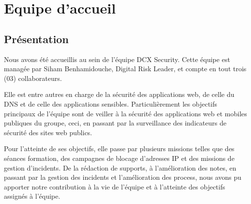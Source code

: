 \documentclass[a4paper,12pt]{book}
\theoremstyle{break}
\begin{document}
\section{Equipe d’accueil}
\subsection{Présentation}
Nous avons été accueillis au sein de l’équipe DCX Security. Cette équipe est managée par Siham Benhamidouche, Digital Risk Leader, et compte en tout trois (03) collaborateurs.


Elle est entre autres en charge de la sécurité des applications web, de celle du \ac{DNS} et de celle des applications sensibles. 
\newline Particulièrement les objectifs principaux de l’équipe sont de veiller à la sécurité des applications web et mobiles publiques du groupe, ceci, en passant par la surveillance des indicateurs de sécurité des sites web publics.


Pour l’atteinte de ses objectifs, elle passe par plusieurs missions telles que des séances formation, des campagnes de blocage d'adresses IP et des missions de gestion d'incidents. 
De la rédaction de supports, à l’amélioration des notes, en passant par la gestion des incidents et l’amélioration des process, nous avons pu apporter notre contribution à la vie de l’équipe et à l’atteinte des objectifs assignés à l’équipe. 
\end{document}
